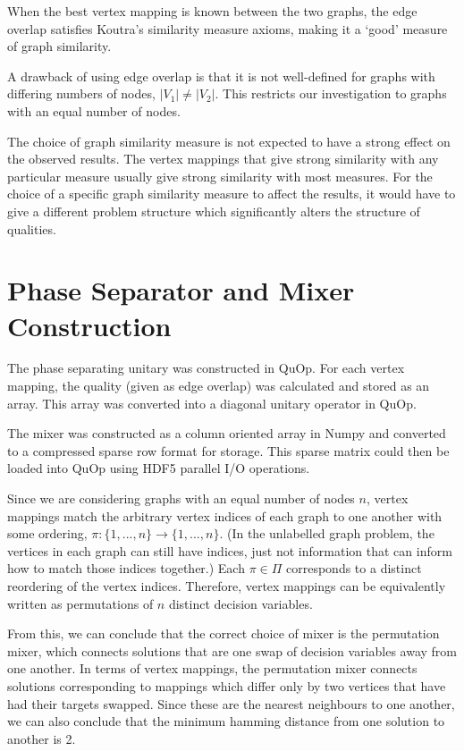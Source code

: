 When the best vertex mapping is known between the two graphs, the edge overlap satisfies Koutra's similarity measure axioms, making it a `good' measure of graph similarity.

A drawback of using edge overlap is that it is not well-defined for graphs with differing numbers of nodes, $|V_1|\neq|V_2|$. This restricts our investigation to graphs with an equal number of nodes.

The choice of graph similarity measure is not expected to have a strong effect on the observed results. The vertex mappings that give strong similarity with any particular measure usually give strong similarity with most measures. For the choice of a specific graph similarity measure to affect the results, it would have to give a different problem structure which significantly alters the structure of qualities.

\section{Phase Separator and Mixer Construction}
The phase separating unitary was constructed in QuOp. For each vertex mapping, the quality (given as edge overlap) was calculated and stored as an array. This array was converted into a diagonal unitary operator in QuOp.

The mixer was constructed as a column oriented array in Numpy and converted to a compressed sparse row format for storage. This sparse matrix could then be loaded into QuOp using HDF5 parallel I/O operations.

Since we are considering graphs with an equal number of nodes $n$, vertex mappings match the arbitrary vertex indices of each graph to one another with some ordering, $\pi:\{1,...,n\}\to\{1,...,n\}$. (In the unlabelled graph problem, the vertices in each graph can still have indices, just not information that can inform how to match those indices together.) Each $\pi\in\Pi$ corresponds to a distinct reordering of the vertex indices. Therefore, vertex mappings can be equivalently written as permutations of $n$ distinct decision variables.

From this, we can conclude that the correct choice of mixer is the permutation mixer, which connects solutions that are one swap of decision variables away from one another. In terms of vertex mappings, the permutation mixer connects solutions corresponding to mappings which differ only by two vertices that have had their targets swapped. Since these are the nearest neighbours to one another, we can also conclude that the minimum hamming distance from one solution to another is 2.

